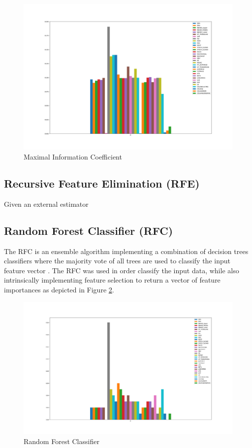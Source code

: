 \documentclass{article}
\begin{document}
\begin{figure}[h!]
	\centering
	\includegraphics[width=\linewidth]{data/MICT1.png}
	\caption{Maximal Information Coefficient}
	\label{fig:MIC}
\end{figure}

\subsection{\color{red}Recursive Feature Elimination (RFE)}
Given an external estimator 


\subsection{\color{red}Random Forest Classifier (RFC)}
The RFC is an ensemble algorithm implementing a combination of decision trees classifiers where the majority vote of all trees are used to classify the input feature vector \cite{pal2005random}. The RFC was used in order classify the input data, while also intrinsically implementing feature selection to return a vector of feature importances as depicted in Figure \ref{fig:RFC}.

\begin{figure}[h!]
	\centering
	\includegraphics[width=\linewidth]{data/RFC_importancesT1.png}
	\caption{Random Forest Classifier}
	\label{fig:RFC}
\end{figure}
\end{document}
